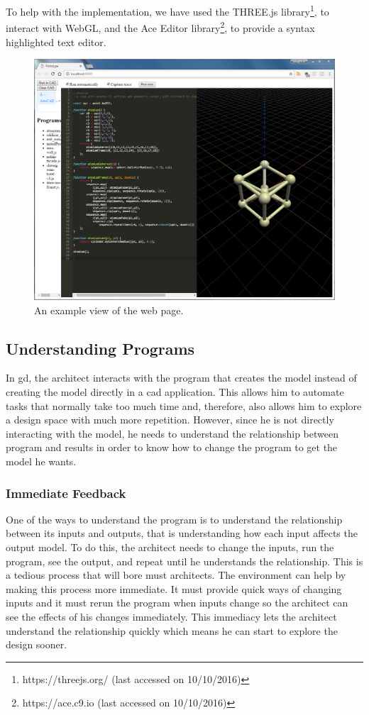To help with the implementation, we have used the THREE.js library\footnote{https://threejs.org/ (last accessed on 10/10/2016)}, to interact with WebGL, and the Ace Editor library\footnote{https://ace.c9.io (last accessed on 10/10/2016)}, to provide a syntax highlighted text editor.


\begin{figure}
  \centering
  \includegraphics[width=12cm]{./images/webpage_view}
  \caption{An example view of the web page.}
  \label{fig:page:view}
\end{figure}


\subsection{Understanding Programs}
In \gls{gd}, the architect interacts with the program that creates the model instead of creating the model directly in a \gls{cad} application.
This allows him to automate tasks that normally take too much time and, therefore, also allows him to explore a design space with much more repetition.
However, since he is not directly interacting with the model, he needs to understand the relationship between program and results in order to know how to change the program to get the model he wants.


\subsubsection{Immediate Feedback}
\label{sec:immediate:feedback}
One of the ways to understand the program is to understand the relationship between its inputs and outputs, that is understanding how each input affects the output model.
To do this, the architect needs to change the inputs, run the program, see the output, and repeat until he understands the relationship.
This is a tedious process that will bore must architects.
The environment can help by making this process more immediate.
It must provide quick ways of changing inputs and it must rerun the program when inputs change so the architect can see the effects of his changes immediately.
This immediacy lets the architect understand the relationship quickly which means he can start to explore the design sooner.

